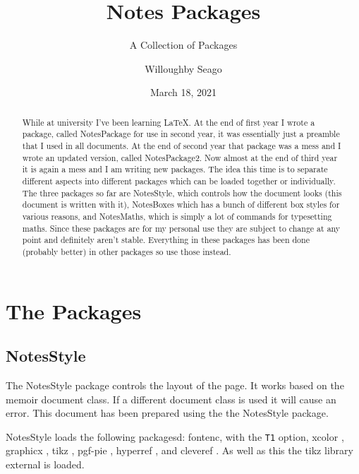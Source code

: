 \documentclass[fleqn, a4paper, openany]{memoir}
\title{Notes Packages}
\author{Willoughby Seago}
\date{March 18, 2021}
\subtitle{A Collection of Packages}
\newcommand{\package}[1]{{\textsf{\footnotesize #1}}}  %
\begin{document}
    \frontmatter
    \titlepage
    \maketitle
    \begin{abstract}
        While at university I've been learning \LaTeX.
        At the end of first year I wrote a package, called \package{NotesPackage} for use in second year, it was essentially just a preamble that I used in all documents.
        At the end of second year that package was a mess and I wrote an updated version, called \package{NotesPackage2}.
        Now almost at the end of third year it is again a mess and I am writing new packages.
        The idea this time is to separate different aspects into different packages which can be loaded together or individually.
        The three packages so far are \package{NotesStyle}, which controls how the document looks (this document is written with it), \package{NotesBoxes} which has a bunch of different box styles for various reasons, and \package{NotesMaths}, which is simply a lot of commands for typesetting maths.
        Since these packages are for my personal use they are subject to change at any point and definitely aren't stable.
        Everything in these packages has been done (probably better) in other packages so use those instead.
    \end{abstract}
    \tableofcontents
    \mainmatter
    \part{The Packages}
    
    \chapter{NotesStyle}
    The \package{NotesStyle} package controls the layout of the page.
    It works based on the \package{memoir} \cite{memoir} document class.
    If a different document class is used it will cause an error.
    This document has been prepared using the the \package{NotesStyle} package.
    
    \package{NotesStyle} loads the following packagesd: \package{fontenc}, with the \verb!T1! option, \package{xcolor} \cite{xcolor}, \package{graphicx} \cite{graphicx}, \package{tikz} \cite{tikz}, \package{pgf-pie} \cite{pgf-pie}, \package{hyperref} \cite{hyperref}, and \package{cleveref} \cite{cleveref}.
    As well as this the \package{tikz} library \package{external} is loaded.
    
\end{document}
